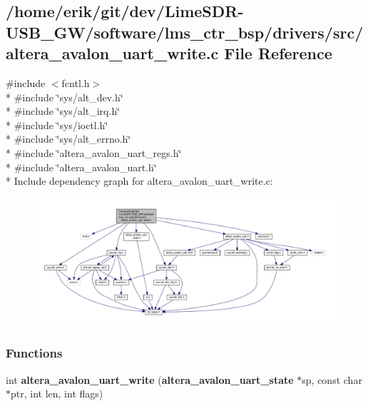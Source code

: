 \subsection{/home/erik/git/dev/\+Lime\+S\+D\+R-\/\+U\+S\+B\+\_\+\+G\+W/software/lms\+\_\+ctr\+\_\+bsp/drivers/src/altera\+\_\+avalon\+\_\+uart\+\_\+write.c File Reference}
\label{altera__avalon__uart__write_8c}
{\ttfamily \#include $<$fcntl.\+h$>$}\\*
{\ttfamily \#include \char`\"{}sys/alt\+\_\+dev.\+h\char`\"{}}\\*
{\ttfamily \#include \char`\"{}sys/alt\+\_\+irq.\+h\char`\"{}}\\*
{\ttfamily \#include \char`\"{}sys/ioctl.\+h\char`\"{}}\\*
{\ttfamily \#include \char`\"{}sys/alt\+\_\+errno.\+h\char`\"{}}\\*
{\ttfamily \#include \char`\"{}altera\+\_\+avalon\+\_\+uart\+\_\+regs.\+h\char`\"{}}\\*
{\ttfamily \#include \char`\"{}altera\+\_\+avalon\+\_\+uart.\+h\char`\"{}}\\*
Include dependency graph for altera\+\_\+avalon\+\_\+uart\+\_\+write.\+c\+:
\nopagebreak
\begin{figure}[H]
\begin{center}
\leavevmode
\includegraphics[width=350pt]{d3/d1d/altera__avalon__uart__write_8c__incl}
\end{center}
\end{figure}
\subsubsection*{Functions}
\begin{DoxyCompactItemize}
\item 
int {\bf altera\+\_\+avalon\+\_\+uart\+\_\+write} ({\bf altera\+\_\+avalon\+\_\+uart\+\_\+state} $\ast$sp, const char $\ast$ptr, int len, int flags)
\end{DoxyCompactItemize}


